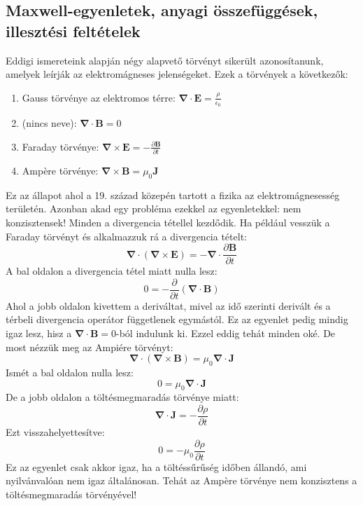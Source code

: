 \documentclass[../main.tex]{subfiles}
\begin{document}
\subsection{Maxwell-egyenletek, anyagi összefüggések, illesztési feltételek}

Eddigi ismereteink alapján négy alapvető törvényt sikerült azonosítanunk, amelyek leírják az elektromágneses jelenségeket. Ezek a törvények a következők:
\begin{enumerate}
    \item Gauss törvénye az elektromos térre: $\boldsymbol{\nabla} \cdot \mathbf{E} = \frac{\rho}{\epsilon_0}$
    \item (nincs neve): $\boldsymbol{\nabla} \cdot \mathbf{B} = 0$
    \item Faraday törvénye: $\boldsymbol{\nabla} \times \mathbf{E} = - \frac{\partial \mathbf{B}}{\partial t}$
    \item Ampère törvénye: $\boldsymbol{\nabla} \times \mathbf{B} = \mu_0 \mathbf{J}$
\end{enumerate}
Ez az állapot ahol a 19. század közepén tartott a fizika az elektromágnesesség területén. Azonban akad egy probléma ezekkel az egyenletekkel: nem konzisztensek!
Minden a divergencia tétellel kezdődik. Ha például vesszük a Faraday törvényt és alkalmazzuk rá a divergencia tételt:
\begin{equation}
    \boldsymbol{\nabla} \cdot (\boldsymbol{\nabla} \times \mathbf{E}) = - \boldsymbol{\nabla} \cdot \frac{\partial \mathbf{B}}{\partial t}
\end{equation}
A bal oldalon a divergencia tétel miatt nulla lesz:
\begin{equation}
    0 = - \frac{\partial }{\partial t} (\boldsymbol{\nabla} \cdot \mathbf{B}) 
\end{equation}
Ahol a jobb oldalon kivettem a deriváltat, mivel az idő szerinti derivált és a térbeli divergencia operátor függetlenek egymástól. Ez az egyenlet pedig mindig igaz lesz, hisz a $\boldsymbol{\nabla} \cdot \mathbf{B} = 0$-ból indulunk ki.
Ezzel eddig tehát minden oké. De most nézzük meg az Ampiére törvényt:
\begin{equation}
    \boldsymbol{\nabla} \cdot (\boldsymbol{\nabla} \times \mathbf{B}) = \mu_0 \boldsymbol{\nabla} \cdot \mathbf{J}
\end{equation}
Ismét a bal oldalon nulla lesz:
\begin{equation}
    0 = \mu_0 \boldsymbol{\nabla} \cdot \mathbf{J}
\end{equation}
De a jobb oldalon a töltésmegmaradás törvénye miatt:
\begin{equation}
    \boldsymbol{\nabla} \cdot \mathbf{J} = - \frac{\partial \rho}{\partial t}
\end{equation}
Ezt visszahelyettesítve:
\begin{equation}
    0 = - \mu_0 \frac{\partial \rho}{\partial t}
\end{equation}
Ez az egyenlet csak akkor igaz, ha a töltéssűrűség időben állandó, ami nyilvánvalóan nem igaz általánosan. Tehát az Ampère törvénye nem konzisztens a töltésmegmaradás törvényével!
\end{document}
